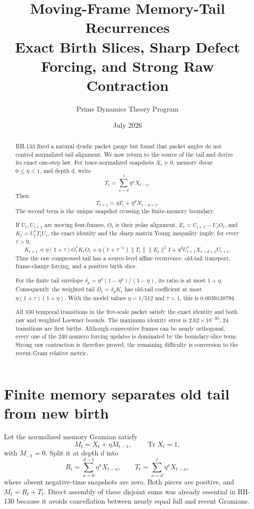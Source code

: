 \documentclass[12pt]{article}
\title{Moving-Frame Memory-Tail Recurrences\\\large Exact Birth Slices, Sharp Defect Forcing, and Strong Raw Contraction}
\author{Prime Dynamics Theory Program}
\date{July 2026}
\newcommand{\Tr}{\operatorname{Tr}}
\begin{document}
\maketitle

\begin{abstract}
RH-133 fixed a natural dyadic packet gauge but found that packet angles do
not control normalized tail alignment.  We now return to the source of the
tail and derive its exact one-step law.  For trace-normalized snapshots
$X_t\succeq0$, memory decay $0\leq\eta<1$, and depth $d$, write
\[
 T_t=\sum_{a=d}^{t}\eta^aX_{t-a}.
\]
Then
\[
 T_{t+1}=\eta T_t+\eta^dX_{t-d+1}.
\]
The second term is the unique snapshot crossing the finite-memory boundary.

If $U_t,U_{t+1}$ are moving four-frames, $O_t$ is their polar alignment,
$E_t=U_{t+1}-U_tO_t$, and $K_t=U_t^*T_tU_t$, the exact identity and the
sharp matrix Young inequality imply, for every $\tau>0$,
\[
 K_{t+1}\preceq
 \eta(1+\tau)O_t^*K_tO_t
 +\eta(1+\tau^{-1})\|T_t\|\|E_t\|^2I
 +\eta^dU_{t+1}^*X_{t-d+1}U_{t+1}.
\]
Thus the raw compressed tail has a source-level affine recurrence: old-tail
transport, frame-change forcing, and a positive birth slice.

For the finite tail envelope
$\delta_p=\eta^d(1-\eta^p)/(1-\eta)$, its ratio is at most $1+\eta$.
Consequently the weighted tail $D_t=\delta_pK_t$ has old-tail coefficient
at most $\eta(1+\tau)(1+\eta)$.  With the model values
$\eta=1/512$ and $\tau=1$, this is $0.0039138794$.

All 330 temporal transitions in the five-scale packet satisfy the exact
identity and both raw and weighted Loewner bounds.  The maximum identity
error is $2.62\times10^{-30}$; 24 transitions are first births.  Although
consecutive frames can be nearly orthogonal, every one of the 240 nonzero
forcing updates is dominated by the boundary-slice term.  Strong raw
contraction is therefore proved; the remaining difficulty is conversion to
the recent-Gram relative metric.
\end{abstract}

\section{Finite memory separates old tail from new birth}
Let the normalized memory Gramian satisfy
\[
 M_t=X_t+\eta M_{t-1},\qquad \Tr X_t=1,
\]
with $M_{-1}=0$.  Split it at depth $d$ into
\[
 R_t=\sum_{a=0}^{d-1}\eta^aX_{t-a},\qquad
 T_t=\sum_{a=d}^{t}\eta^aX_{t-a},
\]
where absent negative-time snapshots are zero.  Both pieces are positive,
and $M_t=R_t+T_t$.  Direct assembly of these disjoint sums was already
essential in RH-130 because it avoids cancellation between nearly equal
full and recent Gramians.
\end{document}
